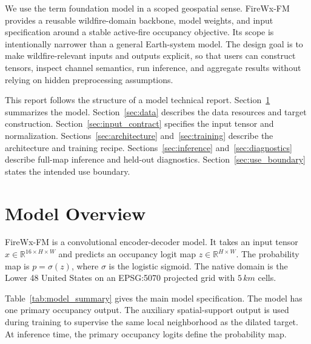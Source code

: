 \documentclass[11pt]{article}
\newcommand{\model}{FireWx-FM}
\newcommand{\grid}{5\,km}
\begin{document}
We use the term foundation model in a scoped geospatial sense.
\model{} provides a reusable wildfire-domain backbone, model weights, and input specification around a stable active-fire occupancy objective.
Its scope is intentionally narrower than a general Earth-system model.
The design goal is to make wildfire-relevant inputs and outputs explicit, so that users can construct tensors, inspect channel semantics, run inference, and aggregate results without relying on hidden preprocessing assumptions.

This report follows the structure of a model technical report.
Section~\ref{sec:overview} summarizes the model.
Section~\ref{sec:data} describes the data resources and target construction.
Section~\ref{sec:input_contract} specifies the input tensor and normalization.
Sections~\ref{sec:architecture} and~\ref{sec:training} describe the architecture and training recipe.
Sections~\ref{sec:inference} and~\ref{sec:diagnostics} describe full-map inference and held-out diagnostics.
Section~\ref{sec:use_boundary} states the intended use boundary.

\section{Model Overview}
\label{sec:overview}

\model{} is a convolutional encoder-decoder model.
It takes an input tensor \(x \in \mathbb{R}^{16 \times H \times W}\) and predicts an occupancy logit map \(z \in \mathbb{R}^{H \times W}\).
The probability map is \(p=\sigma(z)\), where \(\sigma\) is the logistic sigmoid.
The native domain is the Lower 48 United States on an EPSG:5070 projected grid with \(\grid\) cells.

Table~\ref{tab:model_summary} gives the main model specification.
The model has one primary occupancy output.
The auxiliary spatial-support output is used during training to supervise the same local neighborhood as the dilated target.
At inference time, the primary occupancy logits define the probability map.
\end{document}
